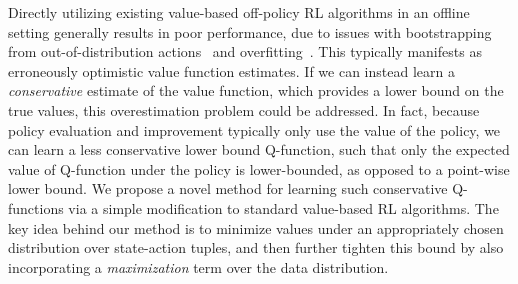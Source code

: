 Directly utilizing existing value-based off-policy RL algorithms in an offline setting generally results in poor performance, due to issues with bootstrapping from out-of-distribution actions~\citep{kumar2019stabilizing,fujimoto2018off} and overfitting~\citep{fu2019diagnosing,kumar2019stabilizing,agarwal2019optimistic}. This typically manifests as erroneously optimistic value function estimates.
If we can instead learn a \emph{conservative} estimate of the value function, which provides a lower bound on the true values, this overestimation problem could be addressed. In fact, because policy evaluation and improvement typically only use the value of the policy, we can learn a less conservative lower bound Q-function, such that only the expected value of Q-function under the policy is lower-bounded, as opposed to a point-wise lower bound.
We propose a novel method for learning such conservative Q-functions via a simple modification to standard value-based RL algorithms. The key idea behind our method is to minimize values under an appropriately chosen distribution over state-action tuples, and then further tighten this bound by also incorporating a \emph{maximization} term over the data distribution.

